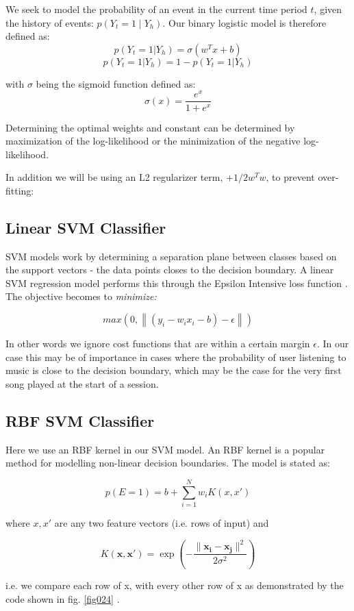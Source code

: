 We seek to model the probability of an event in the current time period $t$, given the history of events: $p(Y_t =1 \mid Y_h)$. Our binary logistic model is therefore defined as:
$$p(Y_t = 1|Y_h) = \sigma(w^Tx + b)$$
$$p(Y_t = 1|Y_h) = 1 - p(Y_t = 1|Y_h)$$

with $\sigma$ being the sigmoid function defined as:
$$\sigma(x)=\frac{e^x}{1+e^x}$$

Determining the optimal weights and constant can be determined by maximization of the log-likelihood or the minimization of the negative log-likelihood. 

In addition we will be using an L2 regularizer term,  $ + 1/2w^Tw$, to prevent over-fitting:

\subsection{Linear SVM Classifier}

SVM models work by determining a separation plane between classes based on the support vectors - the data points closes to the decision boundary. A linear SVM regression model performs this through the Epsilon Intensive loss function \parencite{Vapnik}. The objective becomes to \textit{minimize:}

$$max(0,\left\| (y_i - w_i x_i - b) - \epsilon \right\|)$$

In other words we ignore cost functions that are within a certain margin  $\epsilon$. In our case this may be of importance in cases where the probability of user listening to music is close to the decision boundary, which may be the case for the very first song played at the start of a session.

\subsection{RBF SVM Classifier}

Here we use an RBF kernel in our SVM model. An RBF kernel is a popular method for modelling non-linear decision boundaries. The model is stated as:

$$p(E=1)=b+\sum^N_{i=1}w_iK(x,x')$$

where $x,x'$ are any two feature vectors (i.e. rows of input) and

$$K(\mathbf {x},\mathbf {x'} )=\exp \left(-{\frac {\|\mathbf {x_i} -\mathbf {x_j} \|^{2}}{2\sigma ^{2}}}\right)$$

i.e. we compare each row of x, with every other row of x as demonstrated by the code shown in fig. \ref{fig024} \parencite{soman2009machine}.

